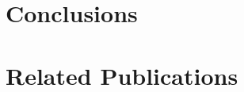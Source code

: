 \chapter{Conclusions}
\label{ch:conc}


\chapter*{Related Publications}
\label{ch:relatedPubs}



\printbibliography[heading=bibintoc]


